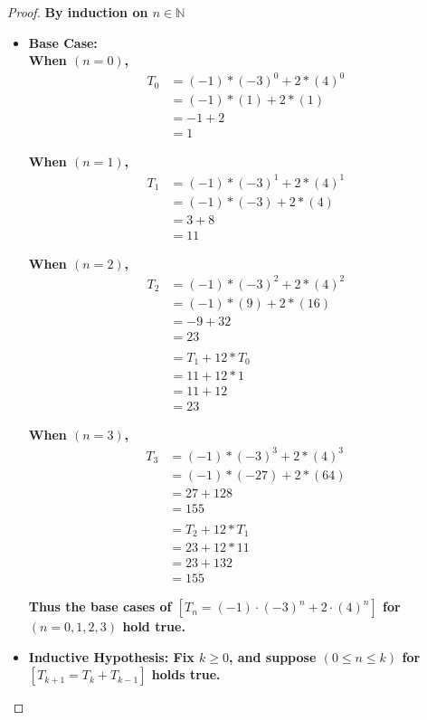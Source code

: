 \documentclass[11pt]{article}
\theoremstyle{definition}
\theoremstyle{definition}
\theoremstyle{definition}
\begin{document}
\begin{proof}\textbf{By induction on $n \in \mathbb{N}$}
\begin{itemize}

\item \textbf{Base Case:}
\\ \textbf{When $(n = 0)$,}
\begin{align*}
T_0 &= (-1)*(-3)^0+2*(4)^0 \\
&= (-1)*(1)+2*(1) \\
&= -1+2 \\
&= 1
\end{align*}

\textbf{When $(n = 1)$,}
\begin{align*}
T_1 &= (-1)*(-3)^1+2*(4)^1 \\
&= (-1)*(-3)+2*(4) \\
&= 3+8 \\
&= 11
\end{align*}

\textbf{When $(n = 2)$,}
\begin{align*}
T_2 &= (-1)*(-3)^2+2*(4)^2 \\
&= (-1)*(9)+2*(16) \\
&= -9+32 \\
&= 23 \\
\\
&= T_1+12*T_0 \\
&= 11+12*1 \\
&= 11+12 \\
&= 23
\end{align*}

\textbf{When $(n = 3)$,}
\begin{align*}
T_3 &= (-1)*(-3)^3+2*(4)^3 \\
&= (-1)*(-27)+2*(64) \\
&= 27+128 \\
&= 155 \\
\\
&= T_2+12*T_1 \\
&= 23+12*11 \\
&= 23+132 \\
&= 155
\end{align*}

\textbf{Thus the base cases of $[T_{n} = (-1) \cdot (-3)^{n} + 2 \cdot (4)^{n}]$ for $(n=0,1,2,3)$ hold true.}

\item \textbf{Inductive Hypothesis: Fix $k \geq 0$, and suppose $(0 \leq n \leq k)$ for $[T_{k+1} = T_k + T_{k-1}]$ holds true.}


\end{itemize}
\end{proof}
\end{document}
